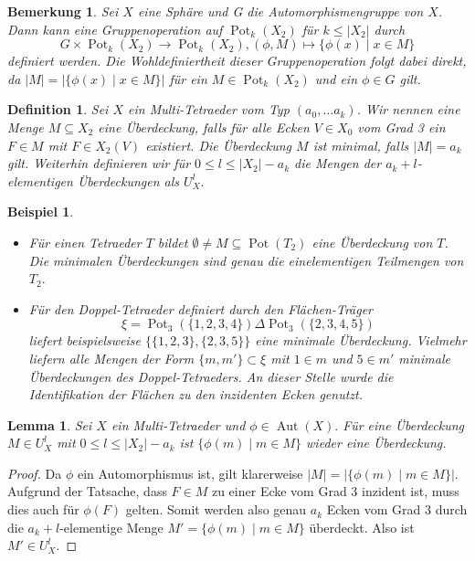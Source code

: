 \documentclass[12pt,titlepage,twoside,cleardoublepage]{article}
\theoremstyle{nummermitklammern}
\newtheorem{lemma}[temp]{Lemma}
\newtheorem{bsp}[temp]{Beispiel}
\newtheorem{definition}[temp]{Definition}
\newtheorem{bemerkung}[temp]{Bemerkung}
\newtheorem{definition}[zahl]{Definition}
\newtheorem{lemma}[zahl]{Lemma}
\newtheorem{bsp}[zahl]{Beispiel}
\newtheorem{bemerkung}[zahl]{Bemerkung}
\numberwithin{equation}{section}
\DeclareMathOperator{\Aut}{Aut}
\DeclareMathOperator{\Pot}{Pot}
\begin{document}
\begin{bemerkung}\label{bemgruppe}
Sei $X$ eine Sphäre und G die Automorphismengruppe von $X$. Dann kann eine Gruppenoperation auf $\Pot_k(X_2)$ für $k \leq \vert X_2 \vert  $ durch 
\[
G\times \Pot_k(X_2) \to \Pot_k(X_2),(\phi , M)\mapsto \{\phi(x)\mid x\in M\}
\]
definiert werden. Die Wohldefiniertheit dieser Gruppenoperation folgt dabei direkt, da $\vert M\vert=\vert\{\phi (x)\mid x\in M\}\vert$ für ein $M\in \Pot_k(X_2)$ und ein $\phi\in G$ gilt.
\end{bemerkung}
\begin{definition}
Sei $X$ ein Multi-Tetraeder vom Typ $(a_0,\ldots a_k)$. Wir nennen eine Menge $M\subseteq X_2$ eine \emph{Überdeckung}, falls für alle Ecken $V\in X_0$ vom Grad 3 ein $F\in M$ mit $F\in X_2(V)$ existiert. Die Überdeckung $M$ ist \emph{minimal}, falls $\vert M\vert=a_k$ gilt.
Weiterhin definieren wir für $0\leq l\leq \vert X_2\vert -a_k$ die Mengen der $a_k+l$-elementigen Überdeckungen als
 $U_X^l.$ 
\end{definition}
\begin{bsp}
\begin{itemize}
\item Für einen Tetraeder $T$ bildet  $\emptyset \neq M \subseteq \Pot(T_2)$ eine Überdeckung von $T$. Die minimalen Überdeckungen sind genau die einelementigen Teilmengen von $T_2.$
\item Für den Doppel-Tetraeder definiert durch den Flächen-Träger 
\[
\xi=\Pot_3(\{1,2,3,4\})\Delta \Pot_3(\{2,3,4,5\})
\]
liefert beispielsweise $\{\{1,2,3\},\{2,3,5\}\}$ eine minimale Überdeckung. Vielmehr liefern alle Mengen der Form $\{m,m'\}\subset \xi$ mit $1\in m$ und $5\in m'$ minimale Überdeckungen des Doppel-Tetraeders. An dieser Stelle wurde die Identifikation der Flächen zu den inzidenten Ecken genutzt.
\end{itemize}
\end{bsp}
\begin{lemma}
Sei $X$ ein Multi-Tetraeder und $\phi \in \Aut(X).$ Für eine Überdeckung $M\in U_X^l$ mit  $0\leq l\leq \vert X_2\vert -a_k$ ist $\{\phi(m)\mid m\in M\}$ wieder eine Überdeckung. \end{lemma}
\begin{proof}
 Da $\phi$ ein Automorphismus ist, gilt
klarerweise $\vert M\vert =\vert\{\phi(m)\mid m\in M\}\vert$.
 Aufgrund der Tatsache, dass $F\in M$ zu einer Ecke vom Grad 3 inzident ist, muss dies auch für $\phi(F)$ gelten. Somit werden also genau $a_k$ Ecken vom Grad 3 durch die $a_k+l$-elementige Menge $M'=\{\phi(m)\mid m\in M\}$ überdeckt. Also ist $M'\in U^l_X.$
\end{proof}
\end{document}
